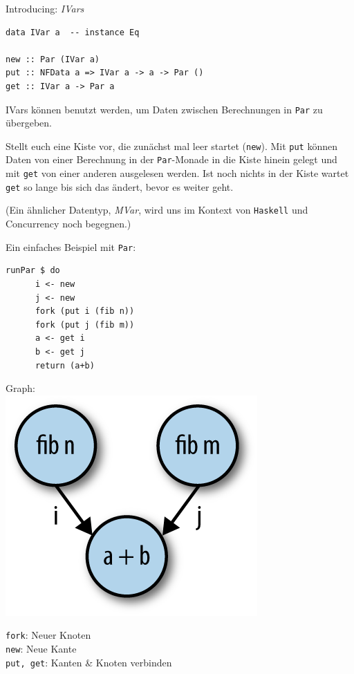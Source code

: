 \documentclass{beamer}
\begin{document}
\begin{frame}[fragile]

Introducing: \emph{IVars}

\begin{verbatim}
data IVar a  -- instance Eq

new :: Par (IVar a)
put :: NFData a => IVar a -> a -> Par ()
get :: IVar a -> Par a
\end{verbatim}
\pause

IVars können benutzt werden, um Daten zwischen Berechnungen in \texttt{Par} zu übergeben.\bigskip 

Stellt euch eine Kiste vor, die zunächst mal leer startet (\texttt{new}). Mit \texttt{put} können Daten von einer Berechnung in der \texttt{Par}-Monade in die Kiste hinein gelegt und mit \texttt{get} von einer anderen ausgelesen werden. Ist noch nichts in der Kiste wartet \texttt{get} so lange bis sich das ändert, bevor es weiter geht.\pause

(Ein ähnlicher Datentyp, \emph{MVar}, wird uns im Kontext von \texttt{Haskell} und Concurrency noch begegnen.)
\end{frame}


\begin{frame}[fragile]

Ein einfaches Beispiel mit \texttt{Par}:

\begin{multicols}{2}
\begin{verbatim}
runPar $ do
      i <- new
      j <- new
      fork (put i (fib n))
      fork (put j (fib m))
      a <- get i
      b <- get j
      return (a+b) 
\end{verbatim}
\pause
\columnbreak
\begin{center}
Graph:\\

\includegraphics[scale=1.25]{parmonad.png} 
\end{center}
\pause
\scriptsize
\texttt{fork}: Neuer Knoten\\
\texttt{new}: Neue Kante\\
\texttt{put, get}: Kanten \& Knoten verbinden
\end{multicols}
\normalsize
\end{frame}
\end{document}
